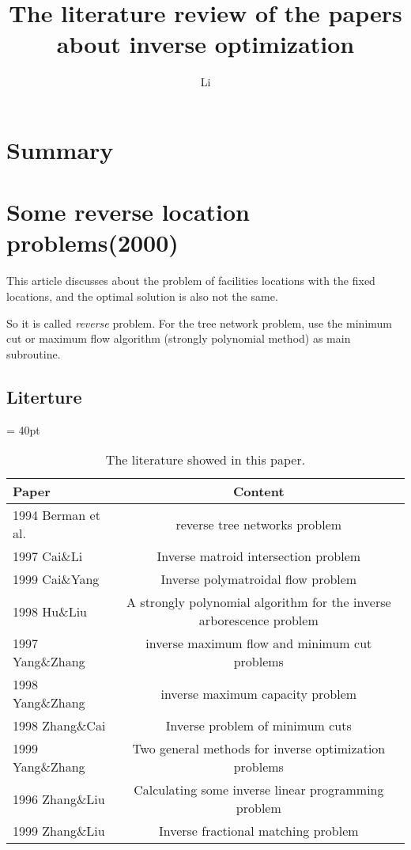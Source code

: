 \documentclass[UTF8]{article}
\title{The literature review of the papers about inverse optimization}
\author{Li}
\begin{document}
\maketitle{}

\section{Summary}




\section{Some reverse location problems(2000)}

This article discusses about the problem of facilities locations with the fixed locations, and the optimal solution is also not the same.

So it is called \emph{reverse} problem. For the tree network problem, use the minimum cut or maximum flow algorithm (strongly polynomial method) as main subroutine.

\subsection{Literture}

\begin{table}[ht]

\tabcolsep = 40pt

\small\renewcommand{}

\caption{The literature showed in this paper.\label{tab:1}}

{\begin{tabular}{lc}
\hline
Paper & Content \\
\hline
1994 Berman et al. & reverse tree networks problem \\
\hline
1997 Cai\&Li &  Inverse matroid intersection problem \\
\hline
1999 Cai\&Yang &  Inverse polymatroidal flow problem \\
\hline
1998 Hu\&Liu &  A strongly polynomial algorithm for the inverse arborescence problem \\
\hline
1997 Yang\&Zhang & inverse maximum flow and minimum cut problems \\
\hline
1998 Yang\&Zhang & inverse maximum capacity problem \\
\hline
1998 Zhang\&Cai  & Inverse problem of minimum cuts \\
\hline
1999 Yang\&Zhang & Two general methods for inverse optimization problems \\
\hline
1996 Zhang\&Liu & Calculating some inverse linear programming problem \\
\hline
1999 Zhang\&Liu & Inverse fractional matching problem \\
\hline
\end{tabular}}
{}
\end{table}
\end{document}
